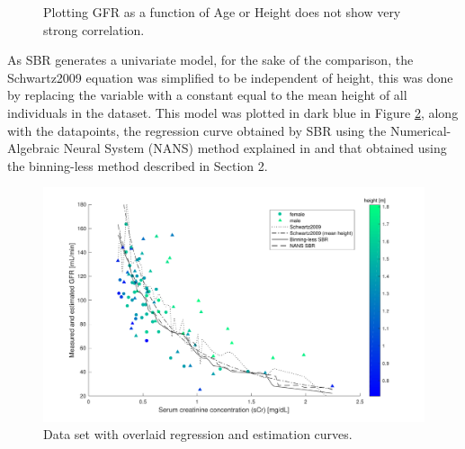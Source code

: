 \documentclass[10pt,final]{siamltex}
\begin{document}
\begin{figure}[ht]
  \centering
  \caption{Plotting GFR as a function of Age or Height does not show very strong correlation.}
  \label{recessive}
\end{figure}

As SBR generates a univariate model, for the sake of the comparison, the Schwartz2009 equation was simplified to be independent of height, this was done by replacing the variable with a constant equal to the mean height of all individuals in the dataset. This model was plotted in dark blue in Figure \ref{regression}, along with the datapoints, the regression curve obtained by SBR using the Numerical-Algebraic Neural System (NANS) method explained in \cite{fiori} and that obtained using the binning-less method described in Section 2.

\begin{figure}[ht]
  \centering
  \includegraphics[scale=0.6]{figures/regression}
  \caption{Data set with overlaid regression and estimation curves. }
  \label{regression}
\end{figure}
\end{document}
